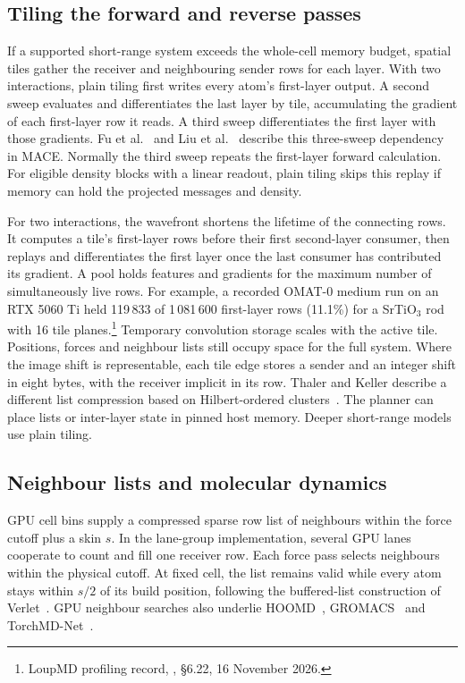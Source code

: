 \subsection{Tiling the forward and reverse passes}
If a supported short-range system exceeds the whole-cell memory budget, spatial tiles gather the receiver and neighbouring sender rows for each layer. With two interactions, plain tiling first writes every atom's first-layer output. A second sweep evaluates and differentiates the last layer by tile, accumulating the gradient of each first-layer row it reads. A third sweep differentiates the first layer with those gradients. Fu et al.~\cite[\S 5]{fu2026symmetrixxl} and Liu et al.~\cite[\S 2.1]{liu2026foundation} describe this three-sweep dependency in MACE. Normally the third sweep repeats the first-layer forward calculation. For eligible density blocks with a linear readout, plain tiling skips this replay if memory can hold the projected messages and density.

For two interactions, the wavefront shortens the lifetime of the connecting rows. It computes a tile's first-layer rows before their first second-layer consumer, then replays and differentiates the first layer once the last consumer has contributed its gradient. A pool holds features and gradients for the maximum number of simultaneously live rows. For example, a recorded OMAT-0 medium run on an RTX 5060 Ti held 119\,833 of 1\,081\,600 first-layer rows (11.1\%) for a SrTiO$_3$ rod with 16 tile planes.\footnote{LoupMD profiling record, , \S 6.22, 16 November 2026.} Temporary convolution storage scales with the active tile. Positions, forces and neighbour lists still occupy space for the full system. Where the image shift is representable, each tile edge stores a sender and an integer shift in eight bytes, with the receiver implicit in its row. Thaler and Keller describe a different list compression based on Hilbert-ordered clusters~\cite{thaler2026compressedneighbors}. The planner can place lists or inter-layer state in pinned host memory. Deeper short-range models use plain tiling.

\subsection{Neighbour lists and molecular dynamics}
GPU cell bins supply a compressed sparse row list of neighbours within the force cutoff plus a skin $s$. In the lane-group implementation, several GPU lanes cooperate to count and fill one receiver row. Each force pass selects neighbours within the physical cutoff. At fixed cell, the list remains valid while every atom stays within $s/2$ of its build position, following the buffered-list construction of Verlet~\cite{verlet1967fluids}. GPU neighbour searches also underlie HOOMD~\cite{anderson2008gpumd}, GROMACS~\cite{pall2020gromacs} and TorchMD-Net~\cite{pelaez2024torchmdnet}.

